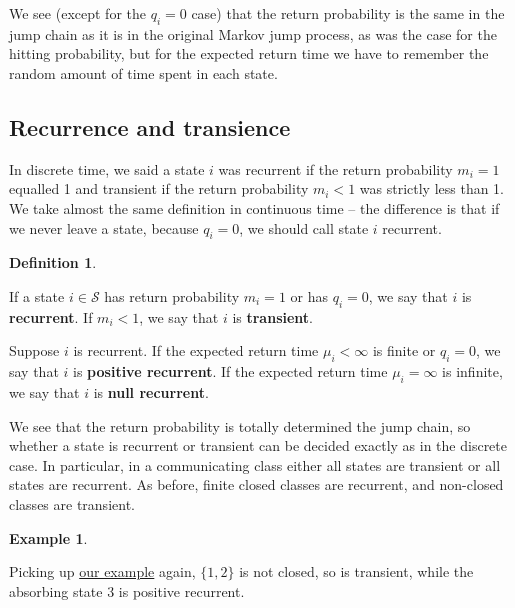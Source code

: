 \documentclass[
  a4paper,
]{article}
\theoremstyle{definition}
\newtheorem{definition}{Definition}[section]
\theoremstyle{definition}
\newtheorem{example}{Example}[section]
\theoremstyle{definition}
\theoremstyle{remark}
\begin{document}
We see (except for the \(q_i = 0\) case) that the return probability is the same in the jump chain as it is in the original Markov jump process, as was the case for the hitting probability, but for the expected return time we have to remember the random amount of time spent in each state.

\hypertarget{recurrence-transience2}{%
\subsection{Recurrence and transience}\label{recurrence-transience2}}

In discrete time, we said a state \(i\) was recurrent if the return probability \(m_i = 1\) equalled 1 and transient if the return probability \(m_i < 1\) was strictly less than 1. We take almost the same definition in continuous time -- the difference is that if we never leave a state, because \(q_i = 0\), we should call state \(i\) recurrent.

\begin{definition}
\protect\hypertarget{def:recurrence-jump}{}\label{def:recurrence-jump}

If a state \(i \in \mathcal S\) has return probability \(m_i = 1\) or has \(q_i = 0\), we say that \(i\) is \textbf{recurrent}. If \(m_i < 1\), we say that \(i\) is \textbf{transient}.

Suppose \(i\) is recurrent. If the expected return time \(\mu_i < \infty\) is finite or \(q_i = 0\), we say that \(i\) is \textbf{positive recurrent}. If the expected return time \(\mu_i = \infty\) is infinite, we say that \(i\) is \textbf{null recurrent}.

\end{definition}

We see that the return probability is totally determined the jump chain, so whether a state is recurrent or transient can be decided exactly as in the discrete case. In particular, in a communicating class either all states are transient or all states are recurrent. As before, finite closed classes are recurrent, and non-closed classes are transient.

\begin{example}
\protect\hypertarget{exm:return-jumps}{}\label{exm:return-jumps}

Picking up \protect\hyperlink{jump-classes}{our example} again, \(\{1,2\}\) is not closed, so is transient, while the absorbing state 3 is positive recurrent.

\end{example}
\end{document}
